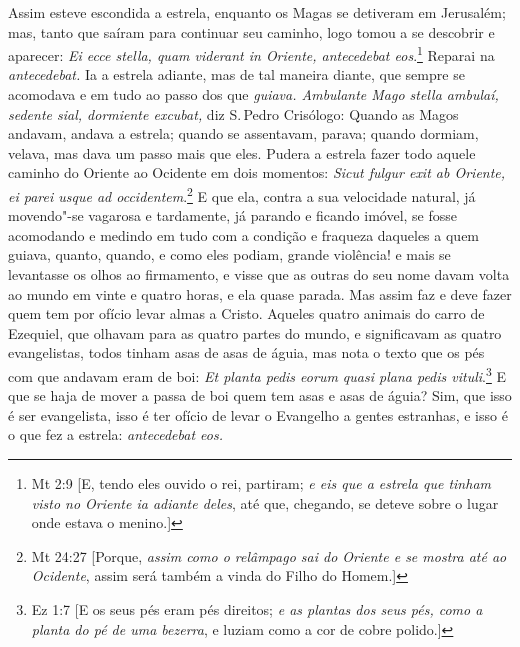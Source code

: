 Assim esteve escondida a estrela, enquanto os Magas se detiveram em
Jerusalém; mas, tanto que saíram para continuar seu caminho, logo tomou
a se descobrir e aparecer: \emph{Ei ecce stella, quam viderant in
Oriente, antecedebat eos}.\footnote{Mt 2:9 [E, tendo eles ouvido o rei, partiram; \emph{e eis que a estrela que tinham visto no Oriente ia adiante deles}, até que, chegando, se deteve sobre o lugar onde estava o menino.]} Reparai na \emph{antecedebat.} Ia
a estrela adiante, mas de tal maneira diante, que sempre se acomodava e
em tudo ao passo dos que \emph{guiava. Ambulante Mago stella ambulaí,
sedente sial, dormiente excubat,} diz S.\,Pedro Crisólogo: Quando as
Magos andavam, andava a estrela; quando se assentavam, parava; quando
dormiam, velava, mas dava um passo mais que eles. Pudera a estrela
fazer todo aquele caminho do Oriente ao Ocidente em dois momentos:
\emph{Sicut fulgur exit ab Oriente, ei parei usque ad occidentem}.\footnote{Mt 24:27 [Porque, \emph{assim como o relâmpago sai do Oriente e se mostra até ao Ocidente}, assim será
também a vinda do Filho do Homem.]} E que ela, contra a sua velocidade natural, já movendo"-se
vagarosa e tardamente, já parando e ficando imóvel, se fosse acomodando
e medindo em tudo com a condição e fraqueza daqueles a quem guiava,
quanto, quando, e como eles podiam, grande violência! e mais se
levantasse os olhos ao firmamento, e visse que as outras do seu nome
davam volta ao mundo em vinte e quatro horas, e ela quase parada. Mas
assim faz e deve fazer quem tem por ofício levar almas a Cristo. Aqueles
quatro animais do carro de Ezequiel, que olhavam para as quatro partes
do mundo, e significavam as quatro evangelistas, todos tinham asas de
asas de águia, mas nota o texto que os pés com que andavam eram de boi:
\emph{Et planta pedis eorum quasi plana pedis vituli}.\footnote{Ez 1:7 [E os seus pés eram pés direitos; \emph{e as plantas dos seus pés, como a planta do pé de uma
bezerra}, e luziam como a cor de cobre polido.]} E que
se haja de mover a passa de boi quem tem asas e asas de águia? Sim, que
isso é ser evangelista, isso é ter ofício de levar o Evangelho a gentes
estranhas, e isso é o que fez a estrela: \emph{antecedebat eos.}

